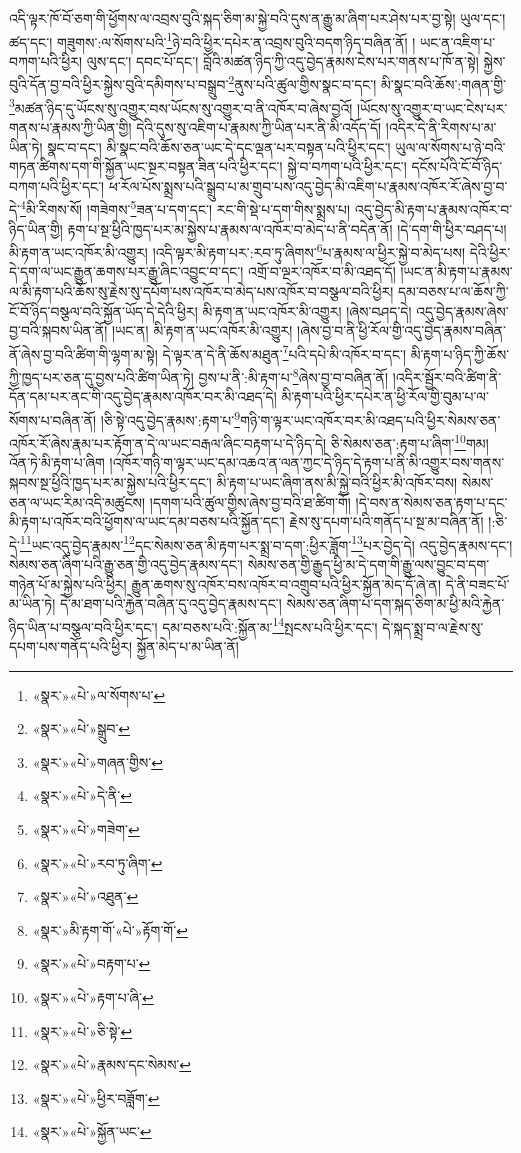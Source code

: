 འདི་ལྟར་ཁོ་བོ་ཅག་གི་ཕྱོགས་ལ་འབྲས་བུའི་སྐད་ཅིག་མ་སྐྱེ་བའི་དུས་ན་རྒྱུ་མ་ཞིག་པར་ཤེས་པར་བྱ་སྟེ། ཡུལ་དང་། ཚད་དང་། གཟུགས་:ལ་སོགས་པའི་\footnote{«སྣར་»«པེ་»ལ་སོགས་པ་}ཉེ་བའི་ཕྱིར་དཔེར་ན་འབྲས་བུའི་བདག་ཉིད་བཞིན་ནོ། །
ཡང་ན་འཇིག་པ་བཀག་པའི་ཕྱིར། ལུས་དང་། དབང་པོ་དང་། བློའི་མཚན་ཉིད་ཀྱི་འདུ་བྱེད་རྣམས་ངེས་པར་གནས་པ་ཁོ་ན་སྟེ། སྐྱེས་བུའི་དོན་བྱ་བའི་ཕྱིར་སྐྱེས་བུའི་དམིགས་པ་བསྒྲུབ་\footnote{«སྣར་»«པེ་»སྒྲུབ་}ནུས་པའི་ཚུལ་གྱིས་སྣང་བ་དང་། མི་སྣང་བའི་ཆོས་:གཞན་གྱི་\footnote{«སྣར་»«པེ་»གཞན་གྱིས་}མཚན་ཉིད་དུ་ཡོངས་སུ་འགྱུར་བས་ཡོངས་སུ་འགྱུར་བ་ནི་འཁོར་བ་ཞེས་བྱའོ། །ཡོངས་སུ་འགྱུར་བ་ཡང་ངེས་པར་གནས་པ་རྣམས་ཀྱི་ཡིན་གྱི། དེའི་དུས་སུ་འཇིག་པ་རྣམས་ཀྱི་ཡིན་པར་ནི་མི་འདོད་དོ། །འདིར་དེ་ནི་རིགས་པ་མ་ཡིན་ཏེ། སྣང་བ་དང་། མི་སྣང་བའི་ཆོས་ཅན་ཡང་དེ་དང་ལྡན་པར་བསྟན་པའི་ཕྱིར་དང་། ཡུལ་ལ་སོགས་པ་ཉེ་བའི་གཏན་ཚིགས་དག་གི་སྐྱོན་ཡང་སྔར་བསྟན་ཟིན་པའི་ཕྱིར་དང་། སྐྱེ་བ་བཀག་པའི་ཕྱིར་དང་། དངོས་པོའི་ངོ་བོ་ཉིད་བཀག་པའི་ཕྱིར་དང་། ཕ་རོལ་པོས་སྨྲས་པའི་སྒྲུབ་པ་མ་གྲུབ་པས་འདུ་བྱེད་མི་འཇིག་པ་རྣམས་འཁོར་རོ་ཞེས་བྱ་བ་དེ་\footnote{«སྣར་»«པེ་»དེ་ནི་}མི་རིགས་སོ། །གཟེགས་\footnote{«སྣར་»«པེ་»གཟེག་}ཟན་པ་དག་དང་། རང་གི་སྡེ་པ་དག་གིས་སྨྲས་པ། འདུ་བྱེད་མི་རྟག་པ་རྣམས་འཁོར་བ་ཉིད་ཡིན་གྱི། རྟག་པ་སྔ་ཕྱིའི་ཁྱད་པར་མ་སྐྱེས་པ་རྣམས་ལ་འཁོར་བ་མེད་པ་ནི་བདེན་ནོ། །དེ་དག་གི་ཕྱིར་བཤད་པ། མི་རྟག་ན་ཡང་འཁོར་མི་འགྱུར། །འདི་ལྟར་མི་རྟག་པར་:རབ་ཏུ་ཞིགས་\footnote{«སྣར་»«པེ་»རབ་ཏུ་ཞིག་}པ་རྣམས་ལ་ཕྱིར་སྐྱེ་བ་མེད་པས། དེའི་ཕྱིར་དེ་དག་ལ་ཡང་རྒྱུན་ཆགས་པར་རྒྱུ་ཞིང་འབྱུང་བ་དང་། འགྲོ་བ་ལྔར་འཁོར་བ་མི་འཐད་དོ། །ཡང་ན་མི་རྟག་པ་རྣམས་ལ་མི་རྟག་པའི་ཆོས་སུ་རྗེས་སུ་དཔོག་པས་འཁོར་བ་མེད་པས་འཁོར་བ་བསྩལ་བའི་ཕྱིར། དམ་བཅས་པ་ལ་ཆོས་ཀྱི་ངོ་བོ་ཉིད་བསྩལ་བའི་སྐྱོན་ཡོད་དེ་དེའི་ཕྱིར། མི་རྟག་ན་ཡང་འཁོར་མི་འགྱུར། །ཞེས་བཤད་དེ། འདུ་བྱེད་རྣམས་ཞེས་བྱ་བའི་སྐབས་ཡིན་ནོ། །ཡང་ན། མི་རྟག་ན་ཡང་འཁོར་མི་འགྱུར། །ཞེས་བྱ་བ་ནི་ཕྱི་རོལ་གྱི་འདུ་བྱེད་རྣམས་བཞིན་ནོ་ཞེས་བྱ་བའི་ཚིག་གི་ལྷག་མ་སྟེ། དེ་ལྟར་ན་དེ་ནི་ཆོས་མཐུན་\footnote{«སྣར་»«པེ་»འཐུན་}པའི་དཔེ་མི་འཁོར་བ་དང་། མི་རྟག་པ་ཉིད་ཀྱི་ཆོས་ཀྱི་ཁྱད་པར་ཅན་དུ་བྱས་པའི་ཚིག་ཡིན་ཏེ། བྱས་པ་ནི་:མི་རྟག་པ་\footnote{«སྣར་»མི་རྟག་གོ་«པེ་»རྟོག་གོ་}ཞེས་བྱ་བ་བཞིན་ནོ། །འདིར་སྦྱོར་བའི་ཚིག་ནི་དོན་དམ་པར་ནང་གི་འདུ་བྱེད་རྣམས་འཁོར་བར་མི་འཐད་དེ། མི་རྟག་པའི་ཕྱིར་དཔེར་ན་ཕྱི་རོལ་གྱི་བུམ་པ་ལ་སོགས་པ་བཞིན་ནོ། །ཅི་སྟེ་འདུ་བྱེད་རྣམས་:རྟག་པ་\footnote{«སྣར་»«པེ་»བརྟག་པ་}གཉི་ག་ལྟར་ཡང་འཁོར་བར་མི་འཐད་པའི་ཕྱིར་སེམས་ཅན་འཁོར་རོ་ཞེས་རྣམ་པར་རྟོག་ན་དེ་ལ་ཡང་བརྒལ་ཞིང་བརྟག་པ་དེ་ཉིད་དེ། ཅི་སེམས་ཅན་:རྟག་པ་ཞིག་\footnote{«སྣར་»«པེ་»རྟག་པ་ཞི་}གམ། འོན་ཏེ་མི་རྟག་པ་ཞིག །འཁོར་གཉི་ག་ལྟར་ཡང་དམ་འཆའ་ན་ལན་ཀྱང་དེ་ཉིད་དེ་རྟག་པ་ནི་མི་འགྱུར་བས་གནས་སྐབས་སྔ་ཕྱིའི་ཁྱད་པར་མ་སྐྱེས་པའི་ཕྱིར་དང་། མི་རྟག་པ་ཡང་ཞིག་ནས་མི་སྐྱེ་བའི་ཕྱིར་མི་འཁོར་བས། སེམས་ཅན་ལ་ཡང་རིམ་འདི་མཚུངས། །དགག་པའི་ཚུལ་གྱིས་ཞེས་བྱ་བའི་ཐ་ཚིག་གོ། །དེ་བས་ན་སེམས་ཅན་རྟག་པ་དང་མི་རྟག་པ་འཁོར་བའི་ཕྱོགས་ལ་ཡང་དམ་བཅས་པའི་སྐྱོན་དང་། རྗེས་སུ་དཔག་པའི་གནོད་པ་སྔ་མ་བཞིན་ནོ། །:ཅི་དེ་\footnote{«སྣར་»«པེ་»ཅི་སྟེ་}ཡང་འདུ་བྱེད་རྣམས་\footnote{«སྣར་»«པེ་»རྣམས་དང་སེམས་}དང་སེམས་ཅན་མི་རྟག་པར་སྨྲ་བ་དག་:ཕྱིར་ཟློག་\footnote{«སྣར་»«པེ་»ཕྱིར་བཟློག་}པར་བྱེད་དེ། འདུ་བྱེད་རྣམས་དང་། སེམས་ཅན་ཞིག་པའི་རྒྱུ་ཅན་གྱི་འདུ་བྱེད་རྣམས་དང་། སེམས་ཅན་གྱི་རྒྱུད་ཕྱི་མ་དེ་དག་གི་རྒྱུ་ལས་བྱུང་བ་དག་གཉེན་པོ་མ་སྐྱེས་པའི་ཕྱིར། རྒྱུན་ཆགས་སུ་འཁོར་བས་འཁོར་བ་འགྲུབ་པའི་ཕྱིར་སྐྱོན་མེད་དོ་ཞེ་ན། དེ་ནི་བཟང་པོ་མ་ཡིན་ཏེ། དེ་མ་ཐག་པའི་རྐྱེན་བཞིན་དུ་འདུ་བྱེད་རྣམས་དང་། སེམས་ཅན་ཞིག་པ་དག་སྐད་ཅིག་མ་ཕྱི་མའི་རྐྱེན་ཉིད་ཡིན་པ་བསྩལ་བའི་ཕྱིར་དང་། དམ་བཅས་པའི་:སྐྱོན་མ་\footnote{«སྣར་»«པེ་»སྐྱོན་ཡང་}སྤངས་པའི་ཕྱིར་དང་། དེ་སྐད་སྨྲ་བ་ལ་རྗེས་སུ་དཔག་པས་གནོད་པའི་ཕྱིར། སྐྱོན་མེད་པ་མ་ཡིན་ནོ། 